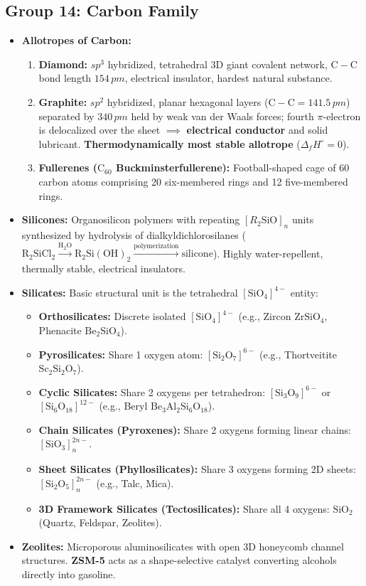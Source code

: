 \documentclass[10pt,a4paper]{article}
\begin{document}
\subsection{Group 14: Carbon Family}
\begin{itemize}
  \item \textbf{Allotropes of Carbon:}
  \begin{enumerate}
    \item \textbf{Diamond:} $sp^3$ hybridized, tetrahedral 3D giant covalent network, $\mathrm{C-C}$ bond length $154\,\si{pm}$, electrical insulator, hardest natural substance.
    \item \textbf{Graphite:} $sp^2$ hybridized, planar hexagonal layers ($\mathrm{C-C} = 141.5\,\si{pm}$) separated by $340\,\si{pm}$ held by weak van der Waals forces; fourth $\pi$-electron is delocalized over the sheet $\implies$ \textbf{electrical conductor} and solid lubricant. \textbf{Thermodynamically most stable allotrope} ($\Delta_f H^\circ = 0$).
    \item \textbf{Fullerenes ($\mathrm{C_{60}}$ Buckminsterfullerene):} Football-shaped cage of 60 carbon atoms comprising 20 six-membered rings and 12 five-membered rings.
  \end{enumerate}
  \item \textbf{Silicones:} Organosilicon polymers with repeating $[R_2\mathrm{SiO}]_n$ units synthesized by hydrolysis of dialkyldichlorosilanes ($\mathrm{R_2SiCl_2} \xrightarrow{\mathrm{H_2O}} \mathrm{R_2Si(OH)_2} \xrightarrow{\text{polymerization}} \text{silicone}$). Highly water-repellent, thermally stable, electrical insulators.
  \item \textbf{Silicates:} Basic structural unit is the tetrahedral $[\mathrm{SiO_4}]^{4-}$ entity:
  \begin{itemize}
    \item \textbf{Orthosilicates:} Discrete isolated $[\mathrm{SiO_4}]^{4-}$ (e.g., Zircon $\mathrm{ZrSiO_4}$, Phenacite $\mathrm{Be_2SiO_4}$).
    \item \textbf{Pyrosilicates:} Share 1 oxygen atom: $[\mathrm{Si_2O_7}]^{6-}$ (e.g., Thortveitite $\mathrm{Sc_2Si_2O_7}$).
    \item \textbf{Cyclic Silicates:} Share 2 oxygens per tetrahedron: $[\mathrm{Si_3O_9}]^{6-}$ or $[\mathrm{Si_6O_{18}}]^{12-}$ (e.g., Beryl $\mathrm{Be_3Al_2Si_6O_{18}}$).
    \item \textbf{Chain Silicates (Pyroxenes):} Share 2 oxygens forming linear chains: $[\mathrm{SiO_3}]_n^{2n-}$.
    \item \textbf{Sheet Silicates (Phyllosilicates):} Share 3 oxygens forming 2D sheets: $[\mathrm{Si_2O_5}]_n^{2n-}$ (e.g., Talc, Mica).
    \item \textbf{3D Framework Silicates (Tectosilicates):} Share all 4 oxygens: $\mathrm{SiO_2}$ (Quartz, Feldspar, Zeolites).
  \end{itemize}
  \item \textbf{Zeolites:} Microporous aluminosilicates with open 3D honeycomb channel structures. \textbf{ZSM-5} acts as a shape-selective catalyst converting alcohols directly into gasoline.
\end{itemize}
\end{document}
